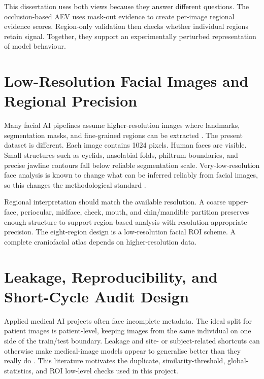 This dissertation uses both views because they answer different questions. The occlusion-based AEV uses mask-out evidence to create per-image regional evidence scores. Region-only validation then checks whether individual regions retain signal. Together, they support an experimentally perturbed representation of model behaviour.


\section{Low-Resolution Facial Images and Regional Precision}

Many facial AI pipelines assume higher-resolution images where landmarks, segmentation masks, and fine-grained regions can be extracted    . The present dataset is different. Each image contains 1024 pixels. Human faces are visible. Small structures such as eyelids, nasolabial folds, philtrum boundaries, and precise jawline contours fall below reliable segmentation scale. Very-low-resolution face analysis is known to change what can be inferred reliably from facial images, so this changes the methodological standard .


Regional interpretation should match the available resolution. A coarse upper-face, periocular, midface, cheek, mouth, and chin/mandible partition preserves enough structure to support region-based analysis with resolution-appropriate precision. The eight-region design is a low-resolution facial ROI scheme. A complete craniofacial atlas depends on higher-resolution data.


\section{Leakage, Reproducibility, and Short-Cycle Audit Design}

Applied medical AI projects often face incomplete metadata. The ideal split for patient images is patient-level, keeping images from the same individual on one side of the train/test boundary. Leakage and site- or subject-related shortcuts can otherwise make medical-image models appear to generalise better than they really do    . This literature motivates the duplicate, similarity-threshold, global-statistics, and ROI low-level checks used in this project.


